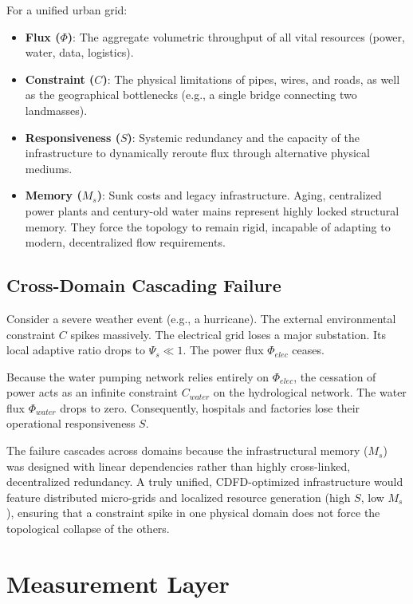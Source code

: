 \documentclass[11pt,a4paper]{article}
\begin{document}
For a unified urban grid:
\begin{itemize}
    \item \textbf{Flux ($\Phi$)}: The aggregate volumetric throughput of all vital resources (power, water, data, logistics).
    \item \textbf{Constraint ($C$)}: The physical limitations of pipes, wires, and roads, as well as the geographical bottlenecks (e.g., a single bridge connecting two landmasses).
    \item \textbf{Responsiveness ($S$)}: Systemic redundancy and the capacity of the infrastructure to dynamically reroute flux through alternative physical mediums.
    \item \textbf{Memory ($M_s$)}: Sunk costs and legacy infrastructure. Aging, centralized power plants and century-old water mains represent highly locked structural memory. They force the topology to remain rigid, incapable of adapting to modern, decentralized flow requirements.
\end{itemize}

\subsection{Cross-Domain Cascading Failure}
Consider a severe weather event (e.g., a hurricane). The external environmental constraint $C$ spikes massively. The electrical grid loses a major substation. Its local adaptive ratio drops to $\Psi_s \ll 1$. The power flux $\Phi_{elec}$ ceases.

Because the water pumping network relies entirely on $\Phi_{elec}$, the cessation of power acts as an infinite constraint $C_{water}$ on the hydrological network. The water flux $\Phi_{water}$ drops to zero. Consequently, hospitals and factories lose their operational responsiveness $S$.

The failure cascades across domains because the infrastructural memory ($M_s$) was designed with linear dependencies rather than highly cross-linked, decentralized redundancy. A truly unified, CDFD-optimized infrastructure would feature distributed micro-grids and localized resource generation (high $S$, low $M_s$), ensuring that a constraint spike in one physical domain does not force the topological collapse of the others.



\section{Measurement Layer}
\end{document}

